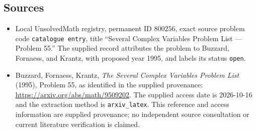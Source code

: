 \documentclass[11pt]{article}
\begin{document}
\subsection{Sources}
\begin{itemize}
\item Local UnsolvedMath registry, permanent ID \(800256\), exact source problem code \texttt{catalogue entry}, title ``Several Complex Variables Problem List --- Problem 55.'' The supplied record attributes the problem to Buzzard, Fornaess, and Krantz, with proposed year 1995, and labels its status \texttt{open}.
\item Buzzard, Fornaess, Krantz, \emph{The Several Complex Variables Problem List} (1995), Problem 55, as identified in the supplied provenance: \url{https://arxiv.org/abs/math/9509202}. The supplied access date is 2026-10-16 and the extraction method is \texttt{arxiv\_latex}. This reference and access information are supplied provenance; no independent source consultation or current literature verification is claimed.
\end{itemize}
\end{document}
